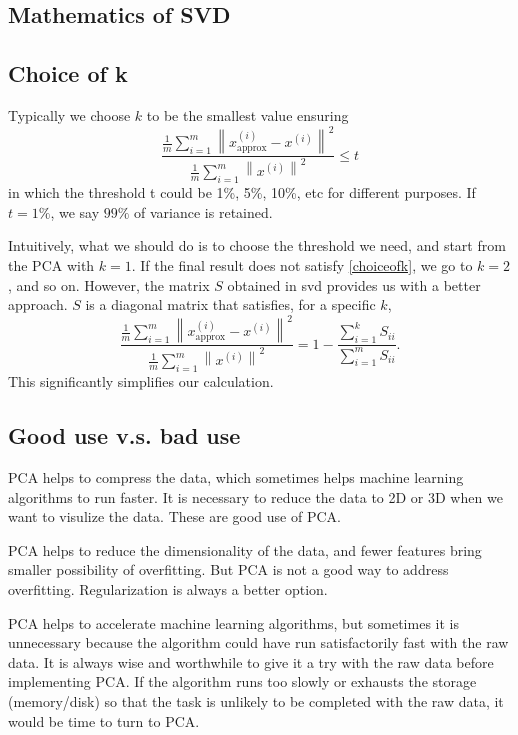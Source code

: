 \subsection{Mathematics of SVD}
\subsection{Choice of k}
Typically we choose $k$ to be the smallest value ensuring
\begin{equation}\label{choiceofk}
\frac{\frac{1}{m}\sum\limits_{i=1}^m\left\lVert x^{(i)}_{\text{approx}} - x^{(i)}\right\rVert^2}
{\frac{1}{m}\sum\limits_{i=1}^m\left\lVert x^{(i)}\right\rVert^2} \le t
\end{equation}
in which the threshold t could be 1\%, 5\%, 10\%, etc for different purposes. If $t=1\%$, we say $99\%$ of variance is retained. 

Intuitively, what we should do is to choose the threshold we need, and start from the PCA with $k=1$. If the final result does not satisfy \eqref{choiceofk}, we go to $k=2$, and so on. However, the matrix $S$ obtained in {\sf svd} provides us with a better approach. $S$ is a diagonal matrix that satisfies, for a specific $k$, 
\begin{equation}
\frac{\frac{1}{m}\sum\limits_{i=1}^m\left\lVert x^{(i)}_{\text{approx}} - x^{(i)}\right\rVert^2}
{\frac{1}{m}\sum\limits_{i=1}^m\left\lVert x^{(i)}\right\rVert^2} = 1 - \frac{\sum\limits_{i=1}^k S_{ii}}{\sum\limits_{i=1}^m S_{ii}}.
\end{equation}
This significantly simplifies our calculation.
\subsection{Good use v.s. bad use}
PCA helps to compress the data, which sometimes helps machine learning algorithms to run faster. It is necessary to reduce the data to 2D or 3D when we want to visulize the data. These are good use of PCA.

PCA helps to reduce the dimensionality of the data, and fewer features bring smaller possibility of overfitting. But PCA is not a good way to address overfitting. Regularization is always a better option.

PCA helps to accelerate machine learning algorithms, but sometimes it is unnecessary because the algorithm could have run satisfactorily fast with the raw data. It is always wise and worthwhile to give it a try with the raw data before implementing PCA. If the algorithm runs too slowly or exhausts the storage (memory/disk) so that the task is unlikely to be completed with the raw data, it would be time to turn to PCA. 

\ifx\PREAMBLE\undefined

\fi